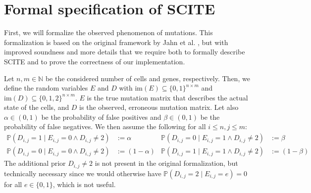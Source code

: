 \section{Formal specification of SCITE}

First, we will formalize the observed phenomenon of mutations. This formalization is based on the original framework by Jahn et al. \cite{tree2016}, but with improved soundness and more details that we require both to formally describe \ac{SCITE} and to prove the correctness of our implementation. 

\begin{definition}
    \label{def:mutmatrix}
    Let $n, m \in \mathbb{N}$ be the considered number of cells and genes, respectively. Then, we define the random variables $E$ and $D$ with $\mathrm{im}(E) \subseteq \{0,1\}^{n \times m}$ and $\mathrm{im}(D) \subseteq \{0, 1, 2\}^{n \times m}$. $E$ is the true mutation matrix that describes the actual state of the cells, and $D$ is the observed, erroneous mutation matrix. Let also $\alpha \in (0,1)$ be the probability of false positives and $\beta \in (0,1)$ be the probability of false negatives. We then assume the following for all $i \leq n, j \leq m$:
    \begin{align*}
        \mathbb{P}(D_{i,j} = 1 \mid E_{i,j} = 0 \wedge D_{i,j} \neq 2) &:= \alpha & \mathbb{P}(D_{i,j} = 0\mid E_{i,j} = 1 \wedge D_{i,j} \neq 2) &:= \beta \\
        \mathbb{P}(D_{i,j} = 0 \mid E_{i,j} = 0 \wedge D_{i,j} \neq 2) &:= (1-\alpha) & \mathbb{P}(D_{i,j} = 1 \mid E_{i,j} = 1 \wedge D_{i,j} \neq 2) &:= (1-\beta)
    \end{align*}
    The additional prior $D_{i,j} \neq 2$ is not present in the original formalization, but technically necessary since we would otherwise have $\mathbb{P}(D_{i,j} = 2 \mid E_{i,j} = e) = 0$ for all $e \in \{0,1\}$, which is not useful.
\end{definition}

